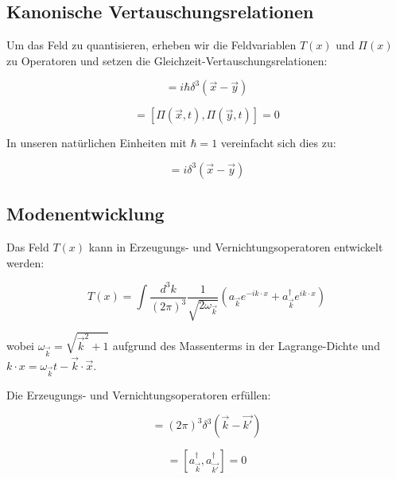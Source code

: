 \documentclass[12pt,a4paper]{article}
\newcommand{\Tfield}{T(x)}
\newcommand{\vecx}{\vec{x}}
\begin{document}
	\subsection{Kanonische Vertauschungsrelationen}
	\label{sec:vertauschungsrelationen}
	
	Um das Feld zu quantisieren, erheben wir die Feldvariablen $\Tfield$ und $\Pi(x)$ zu Operatoren und setzen die Gleichzeit-Vertauschungsrelationen:
	
	\begin{equation}
		[\Tfield(\vecx, t), \Pi(\vec{y}, t)] = i\hbar\delta^3(\vecx - \vec{y})
	\end{equation}
	
	\begin{equation}
		[\Tfield(\vecx, t), \Tfield(\vec{y}, t)] = [\Pi(\vecx, t), \Pi(\vec{y}, t)] = 0
	\end{equation}
	
	In unseren natürlichen Einheiten mit $\hbar = 1$ vereinfacht sich dies zu:
	
	\begin{equation}
		[\Tfield(\vecx, t), \Pi(\vec{y}, t)] = i\delta^3(\vecx - \vec{y})
	\end{equation}
	
	\subsection{Modenentwicklung}
	\label{sec:modenentwicklung}
	
	Das Feld $\Tfield$ kann in Erzeugungs- und Vernichtungsoperatoren entwickelt werden:
	
	\begin{equation}
		\Tfield = \int \frac{d^3k}{(2\pi)^3} \frac{1}{\sqrt{2\omega_{\vec{k}}}} \left(a_{\vec{k}} e^{-ik \cdot x} + a_{\vec{k}}^{\dagger} e^{ik \cdot x}\right)
	\end{equation}
	
	wobei $\omega_{\vec{k}} = \sqrt{\vec{k}^2 + 1}$ aufgrund des Massenterms in der Lagrange-Dichte und $k \cdot x = \omega_{\vec{k}}t - \vec{k} \cdot \vecx$.
	
	Die Erzeugungs- und Vernichtungsoperatoren erfüllen:
	
	\begin{equation}
		[a_{\vec{k}}, a_{\vec{k'}}^{\dagger}] = (2\pi)^3 \delta^3(\vec{k} - \vec{k'})
	\end{equation}
	
	\begin{equation}
		[a_{\vec{k}}, a_{\vec{k'}}] = [a_{\vec{k}}^{\dagger}, a_{\vec{k'}}^{\dagger}] = 0
	\end{equation}
	
\end{document}
